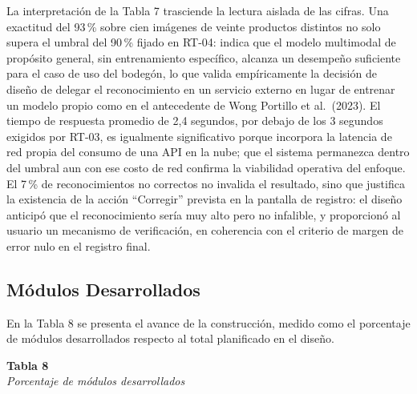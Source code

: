 \documentclass[12pt, letterpaper]{report}
\begin{document}
\vspace{6pt}

La interpretación de la Tabla 7 trasciende la lectura aislada de las
cifras. Una exactitud del 93\,\% sobre cien imágenes de veinte
productos distintos no solo supera el umbral del 90\,\% fijado en RT-04:
indica que el modelo multimodal de propósito general, sin
entrenamiento específico, alcanza un desempeño suficiente para el caso
de uso del bodegón, lo que valida empíricamente la decisión de diseño
de delegar el reconocimiento en un servicio externo en lugar de
entrenar un modelo propio como en el antecedente de Wong Portillo et
al.\ (2023). El tiempo de respuesta promedio de 2,4 segundos, por
debajo de los 3 segundos exigidos por RT-03, es igualmente
significativo porque incorpora la latencia de red propia del consumo de
una API en la nube; que el sistema permanezca dentro del umbral aun con
ese costo de red confirma la viabilidad operativa del enfoque. El
7\,\% de reconocimientos no correctos no invalida el resultado, sino
que justifica la existencia de la acción ``Corregir'' prevista en la
pantalla de registro: el diseño anticipó que el reconocimiento sería
muy alto pero no infalible, y proporcionó al usuario un mecanismo de
verificación, en coherencia con el criterio de margen de error nulo en
el registro final.

\subsection{Módulos Desarrollados}

En la Tabla 8 se presenta el avance de la construcción, medido como el
porcentaje de módulos desarrollados respecto al total planificado en el
diseño.

\vspace{6pt}
%
\noindent\textbf{Tabla 8}\\
\textit{Porcentaje de módulos desarrollados}
\vspace{4pt}
\end{document}
